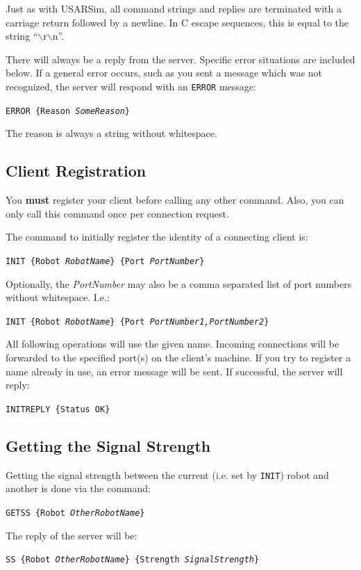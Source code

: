 \documentclass[11pt,a4paper]{article}
\begin{document}
Just as with USARSim, all command strings and replies are terminated with a carriage return followed by a newline. In C escape sequences, this is equal to the string ``$\backslash$r$\backslash$n''.

There will always be a reply from the server. Specific error situations are included below. If a general error occurs, such as you sent a message which was not recognized, the server will respond with an \texttt{ERROR} message:

\texttt{ERROR \{Reason \textit{SomeReason}\}}

The reason is always a string without whitespace.

\subsection{Client Registration}

You \textbf{must} register your client before calling any other command. Also, you can only call this command once per connection request.

The command to initially register the identity of a connecting client is:

\texttt{INIT \{Robot \textit{RobotName}\} \{Port \textit{PortNumber}\} }

Optionally, the \textit{PortNumber} may also be a comma separated list of port numbers without whitespace. I.e.:

\texttt{INIT \{Robot \textit{RobotName}\} \{Port \textit{PortNumber1,PortNumber2}\} }

All following operations will use the given name. Incoming connections will be forwarded to the specified port(s) on the client's machine. If you try to register a name already in use, an error message will be sent. If successful, the server will reply:

\texttt{INITREPLY \{Status OK\}}

\subsection{Getting the Signal Strength}

Getting the signal strength between the current (i.e. set by \texttt{INIT}) robot and another is done via the command:

\texttt{GETSS \{Robot \textit{OtherRobotName}\} }

The reply of the server will be:

\texttt{SS \{Robot \textit{OtherRobotName}\} \{Strength \textit{SignalStrength}\}}
\end{document}
